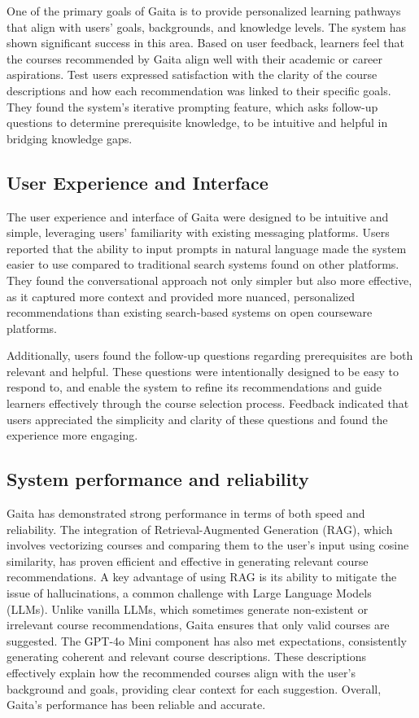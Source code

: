 One of the primary goals of Gaita is to provide personalized learning pathways that align with users’ goals, backgrounds, and knowledge levels. The system has shown significant success in this area. Based on user feedback, learners feel that the courses recommended by Gaita align well with their academic or career aspirations. Test users expressed satisfaction with the clarity of the course descriptions and how each recommendation was linked to their specific goals. They found the system's iterative prompting feature, which asks follow-up questions to determine prerequisite knowledge, to be intuitive and helpful in bridging knowledge gaps. 

\subsection{User Experience and Interface}

The user experience and interface of Gaita were designed to be intuitive and simple, leveraging users' familiarity with existing messaging platforms. Users reported that the ability to input prompts in natural language made the system easier to use compared to traditional search systems found on other platforms. They found the conversational approach not only simpler but also more effective, as it captured more context and provided more nuanced, personalized recommendations than existing search-based systems on open courseware platforms.

Additionally, users found the follow-up questions regarding prerequisites are both relevant and helpful. These questions were intentionally designed to be easy to respond to, and enable the system to refine its recommendations and guide learners effectively through the course selection process. Feedback indicated that users appreciated the simplicity and clarity of these questions and found the experience more engaging. 

\subsection{System performance and reliability}

Gaita has demonstrated strong performance in terms of both speed and reliability. The integration of Retrieval-Augmented Generation (RAG), which involves vectorizing courses and comparing them to the user’s input using cosine similarity, has proven efficient and effective in generating relevant course recommendations. A key advantage of using RAG is its ability to mitigate the issue of hallucinations, a common challenge with Large Language Models (LLMs). Unlike vanilla LLMs, which sometimes generate non-existent or irrelevant course recommendations, Gaita ensures that only valid courses are suggested. The GPT-4o Mini component has also met expectations, consistently generating coherent and relevant course descriptions. These descriptions effectively explain how the recommended courses align with the user’s background and goals, providing clear context for each suggestion. Overall, Gaita's performance has been reliable and accurate.

